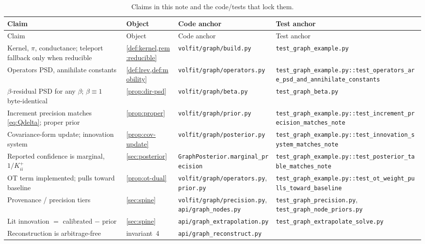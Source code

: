 \documentclass[11pt]{article}
\begin{document}
\begingroup
\small
\setlength{\tabcolsep}{3pt}
\begin{longtable}{@{}p{}p{}p{}p{}@{}}
\caption{Claims in this note and the code/tests that lock them.}\\
\toprule
Claim & Object & Code anchor & Test anchor\\
\midrule
\endfirsthead
\toprule Claim & Object & Code anchor & Test anchor\\ \midrule
\endhead
Kernel, $\pi$, conductance; teleport fallback only when reducible &
\cref{def:kernel,rem:reducible} &
\nolinkurl{volfit/graph/build.py} &
\nolinkurl{test_graph_example.py}\\
Operators PSD, annihilate constants &
\cref{def:lrev,def:mobility} &
\nolinkurl{volfit/graph/operators.py} &
\nolinkurl{test_graph_example.py::test_operators_are_psd_and_annihilate_constants}\\
$\beta$-residual PSD for any $\beta$; $\beta\equiv1$ byte-identical &
\cref{prop:dir-psd} &
\nolinkurl{volfit/graph/beta.py} &
\nolinkurl{test_graph_beta.py}\\
Increment precision matches \eqref{eq:Qdelta}; proper prior &
\cref{prop:proper} &
\nolinkurl{volfit/graph/prior.py} &
\nolinkurl{test_graph_example.py::test_increment_precision_matches_note}\\
Covariance-form update; innovation system &
\cref{prop:cov-update} &
\nolinkurl{volfit/graph/posterior.py} &
\nolinkurl{test_graph_example.py::test_innovation_system_matches_note}\\
Reported confidence is marginal, $1/K^+_{ii}$ &
\cref{sec:posterior} &
\nolinkurl{GraphPosterior.marginal_precision} &
\nolinkurl{test_graph_example.py::test_posterior_table_matches_note}\\
OT term implemented; pulls toward baseline &
\cref{prop:ot-dual} &
\nolinkurl{volfit/graph/operators.py}, \nolinkurl{prior.py} &
\nolinkurl{test_graph_example.py::test_ot_weight_pulls_toward_baseline}\\
Provenance / precision tiers &
\cref{sec:spine} &
\nolinkurl{volfit/graph/precision.py}, \nolinkurl{api/graph_nodes.py} &
\nolinkurl{test_graph_precision.py}, \nolinkurl{test_graph_node_priors.py}\\
Lit innovation $=$ calibrated $-$ prior &
\cref{sec:spine} &
\nolinkurl{api/graph_extrapolation.py} &
\nolinkurl{test_graph_extrapolate_solve.py}\\
Reconstruction is arbitrage-free &
invariant~4 &
\nolinkurl{api/graph_reconstruct.py} &

\end{longtable}
\end{document}
